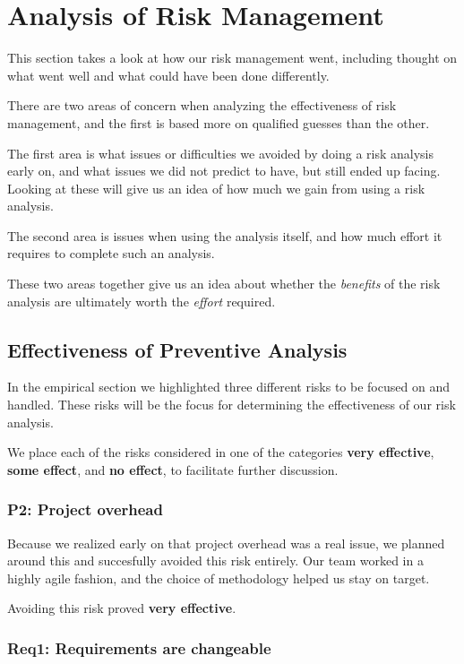 \section{Analysis of Risk Management}
This section takes a look at how our risk management went, including thought on what went well and what could have been done differently.
\label{sec:AnalysisRiskManagement}

There are two areas of concern when analyzing the effectiveness of risk management, and the first is
based more on qualified guesses than the other.

The first area is what issues or difficulties we avoided by doing a risk analysis early on, and what
issues we did not predict to have, but still ended up facing. Looking at these will give us an idea
of how much we gain from using a risk analysis.

The second area is issues when using the analysis itself, and how much effort it requires to complete
such an analysis.

These two areas together give us an idea about whether the \emph{benefits} of the risk analysis are
ultimately worth the \emph{effort} required.

\subsection{Effectiveness of Preventive Analysis}

In the empirical section we highlighted three different risks to be focused on and handled. These risks
will be the focus for determining the effectiveness of our risk analysis.

We place each of the risks considered in one of the categories \textbf{very effective}, \textbf{some
effect}, and \textbf{no effect}, to facilitate further discussion.

\subsubsection{P2: Project overhead}

Because we realized early on that project overhead was a real issue, we planned around this and succesfully
avoided this risk entirely. Our team worked in a highly agile fashion, and the choice of methodology helped
us stay on target.

Avoiding this risk proved \textbf{very effective}.

\subsubsection{Req1: Requirements are changeable}

